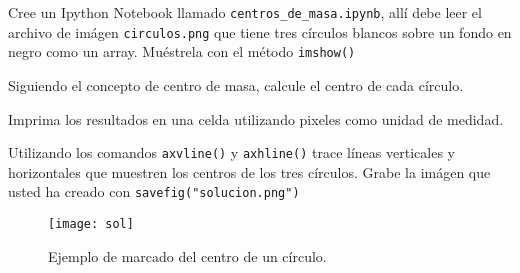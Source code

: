 \documentclass[11pt,letterpaper]{exam}
\begin{document}
\begin{questions}


Cree un Ipython Notebook llamado \verb"centros_de_masa.ipynb", allí
debe leer el archivo de imágen \verb"circulos.png" que tiene tres círculos blancos 
sobre un fondo en negro como un array. Muéstrela con el método
\verb"imshow()"

Siguiendo el concepto de centro de masa, calcule el centro de cada círculo.

Imprima los resultados en una celda utilizando pixeles como unidad de medidad.



Utilizando los comandos \verb"axvline()" y \verb"axhline()" trace líneas verticales
y horizontales que muestren los centros de los tres círculos. 
Grabe la imágen que usted ha creado con \texttt{savefig("solucion.png")}

\begin{figure}[hb]
\begin{centering}
\texttt{[image: sol]}
\caption{Ejemplo de marcado del centro de un círculo.}
\end{centering}
\end{figure}
\end{questions}
\end{document}
